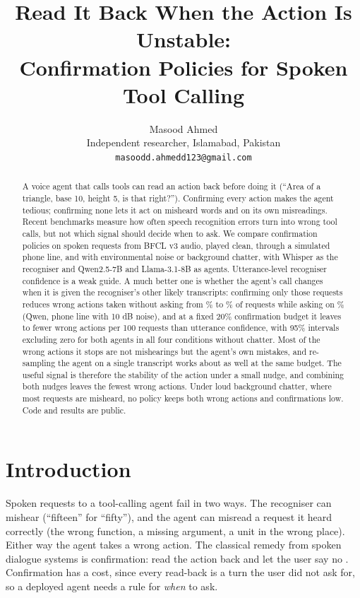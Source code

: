 \documentclass[11pt]{article}
\title{Read It Back When the Action Is Unstable:\\Confirmation Policies for Spoken Tool Calling}
\author{Masood Ahmed \\
  Independent researcher, Islamabad, Pakistan \\
  \texttt{masoodd.ahmedd123@gmail.com}}
\begin{document}
\maketitle

\begin{abstract}
A voice agent that calls tools can read an action back before doing it (``Area of a triangle, base 10, height 5, is that right?''). Confirming every action makes the agent tedious; confirming none lets it act on misheard words and on its own misreadings. Recent benchmarks measure how often speech recognition errors turn into wrong tool calls, but not which signal should decide when to ask. We compare confirmation policies on \NItems{} spoken requests from BFCL v3 audio, played clean, through a simulated phone line, and with environmental noise or background chatter, with Whisper as the recogniser and Qwen2.5-7B and Llama-3.1-8B as agents. Utterance-level recogniser confidence is a weak guide. A much better one is whether the agent's call changes when it is given the recogniser's other likely transcripts: confirming only those requests reduces wrong actions taken without asking from \HeadNever\% to \HeadEither\% of requests while asking on \HeadAsked\% (Qwen, phone line with 10 dB noise), and at a fixed 20\% confirmation budget it leaves \GainMin{} to \GainMax{} fewer wrong actions per 100 requests than utterance confidence, with 95\% intervals excluding zero for both agents in all four conditions without chatter. Most of the wrong actions it stops are not mishearings but the agent's own mistakes, and re-sampling the agent on a single transcript works about as well at the same budget. The useful signal is therefore the stability of the action under a small nudge, and combining both nudges leaves the fewest wrong actions. Under loud background chatter, where most requests are misheard, no policy keeps both wrong actions and confirmations low. Code and results are public.
\end{abstract}

\section{Introduction}

Spoken requests to a tool-calling agent fail in two ways. The recogniser can mishear (``fifteen'' for ``fifty''), and the agent can misread a request it heard correctly (the wrong function, a missing argument, a unit in the wrong place). Either way the agent takes a wrong action. The classical remedy from spoken dialogue systems is confirmation: read the action back and let the user say no \citep{sturm1999arise,bohus2005rejection}. Confirmation has a cost, since every read-back is a turn the user did not ask for, so a deployed agent needs a rule for \emph{when} to ask.
\end{document}
